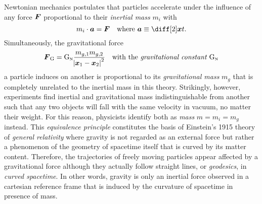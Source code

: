 \documentclass[12pt,parskip=half]{scrreprt}
\begin{document}
Newtonian mechanics postulates that particles accelerate under the influence of any force \(\boldsymbol{F}\) proportional to their \emph{inertial mass} \(m_i\) with
\begin{equation}
	m_i \cdot \vect{a} = \vect{F} \quad \text{where \(\vect{a} \equiv \ddt{\vect{x}}\).}
\end{equation}
Simultaneously, the gravitational force
\begin{equation}
	\boldsymbol{F}_\textnormal{G} = \mathrm{G}_\textnormal{\tiny{N}} \frac{m_{g,1}m_{g,2}}{\abs{\boldsymbol{x}_1-\boldsymbol{x}_2}^2} \quad \text{with the \emph{gravitational constant \(\mathrm{G}_\textnormal{\tiny{N}}\)}}
\end{equation}
a particle induces on another is proportional to its \emph{gravitational mass} \(m_g\) that is completely unrelated to the inertial mass in this theory. Strikingly, however, experiments find inertial and gravitational mass indistinguishable from another  such that any two objects will fall with the same velocity in vacuum, no matter their weight. For this reason, physicists identify both as \emph{mass} \(m=m_i=m_g\) instead. This \emph{equivalence principle} constitutes the basis of Einstein's 1915 theory of \emph{general relativity} where gravity is not regarded as an external force but rather a phenomenon of the geometry of spacetime itself that is curved by its matter content. Therefore, the trajectories of freely moving particles appear affected by a gravitational force although they actually follow straight lines, or \emph{geodesics}, in \emph{curved spacetime}. In other words, gravity is only an inertial force observed in a cartesian reference frame that is induced by the curvature of spacetime in presence of mass.
\end{document}
